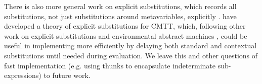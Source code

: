 %
There is also more general work on explicit substitutions, which records all  substitutions, not just substitutions around metavariables, explicitly \cite{Abadi:1991fr,levy1999explicit}.  \citet{DBLP:journals/corr/abs-1009-2789} have developed a theory of explicit substitutions for CMTT, which, following other work on explicit substitutions and environmental abstract machines \cite{DBLP:journals/tcs/Curien91}, could be useful in implementing \HazelnutLive more efficiently by delaying both standard and contextual substitutions until needed during evaluation. We leave this and other questions of fast implementation (e.g. using thunks to encapsulate indeterminate sub-expressions) to future work. 







